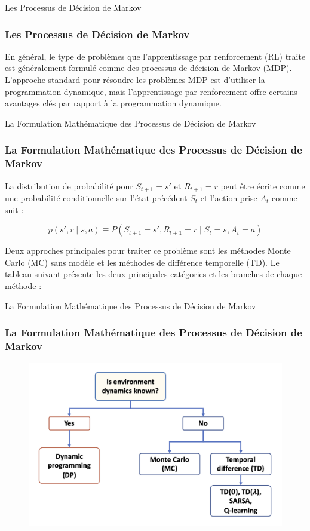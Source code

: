 \documentclass[serif, aspectratio=169]{beamer}
\begin{document}
\begin{frame}{Les Processus de Décision de Markov}
	\frametitle<presentation>{Les Processus de Décision de Markov}
	
	En général, le type de problèmes que l'apprentissage par renforcement (RL) traite est généralement formulé comme des processus de décision de Markov (MDP). L'approche standard pour résoudre les problèmes MDP est d'utiliser la programmation dynamique, mais l'apprentissage par renforcement offre certains avantages clés par rapport à la programmation dynamique. 
	
\end{frame}

\begin{frame}{La Formulation Mathématique des Processus de Décision de Markov}
	\frametitle{La Formulation Mathématique des Processus de Décision de Markov}
	
	La distribution de probabilité pour \( S_{t+1} = s' \) et \( R_{t+1} = r \) peut être écrite comme une probabilité conditionnelle sur l'état précédent \( S_t \) et l'action prise \( A_t \) comme suit :
	
	\[
	p(s', r \mid s, a) \equiv P(S_{t+1} = s', R_{t+1} = r \mid S_t = s, A_t = a)
	\]
	
	\vspace{20pt}
	
	Deux approches principales pour traiter ce problème sont les méthodes Monte Carlo (MC) sans modèle et les méthodes de différence temporelle (TD). Le tableau suivant présente les deux principales catégories et les branches de chaque méthode :
	
\end{frame}

\begin{frame}{La Formulation Mathématique des Processus de Décision de Markov}
	\frametitle{La Formulation Mathématique des Processus de Décision de Markov}
	
	\begin{figure}[htpb]
		\centering
		\includegraphics[keepaspectratio, scale=0.8]{images/markov.png}
	\end{figure}
	
\end{frame}
\end{document}
